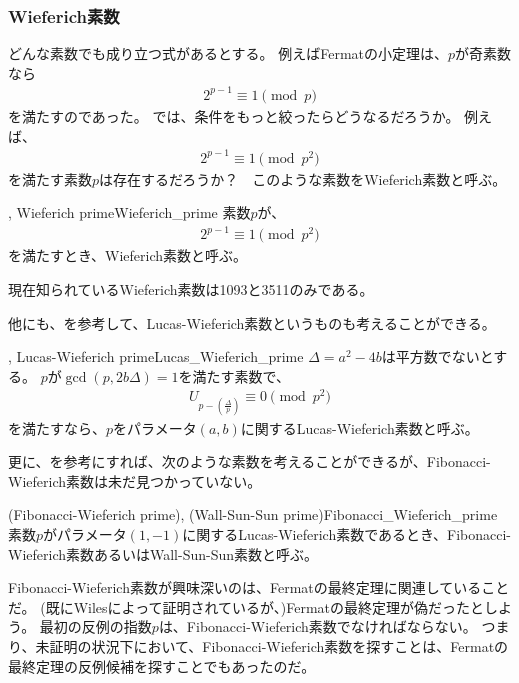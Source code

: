 \subsubsection{Wieferich素数}
どんな素数でも成り立つ式があるとする。
例えばFermatの小定理は、$p$が奇素数なら
\begin{align*}
2^{p-1} \equiv 1 \pmod{p}
\end{align*}
を満たすのであった。
では、条件をもっと絞ったらどうなるだろうか。
例えば、
\begin{align*}
2^{p-1} \equiv 1 \pmod{p^2}
\end{align*}
を満たす素数$p$は存在するだろうか？　このような素数をWieferich素数と呼ぶ。

\begin{Defi}{, Wieferich prime}{Wieferich_prime}
素数$p$が、
\begin{align*}
2^{p-1} \equiv 1 \pmod{p^2}
\end{align*}
を満たすとき、Wieferich素数と呼ぶ。
\end{Defi}

現在知られているWieferich素数は1093と3511のみである。

他にも、を参考して、Lucas-Wieferich素数というものも考えることができる。

\begin{Defi}{, Lucas-Wieferich prime}{Lucas_Wieferich_prime}
$\Delta=a^2-4b$は平方数でないとする。
$p$が$\gcd(p, 2b\Delta)=1$を満たす素数で、
\begin{align*}
U_{p - \left(\frac{\Delta}{p}\right)} \equiv 0 \pmod{p^2}
\end{align*}
を満たすなら、$p$をパラメータ$(a,b)$に関するLucas-Wieferich素数と呼ぶ。
\end{Defi}

更に、を参考にすれば、次のような素数を考えることができるが、Fibonacci-Wieferich素数は未だ見つかっていない。

\begin{Defi}{(Fibonacci-Wieferich prime), (Wall-Sun-Sun prime)}{Fibonacci_Wieferich_prime}
素数$p$がパラメータ$(1,-1)$に関するLucas-Wieferich素数であるとき、Fibonacci-Wieferich素数あるいはWall-Sun-Sun素数と呼ぶ。
\end{Defi}

Fibonacci-Wieferich素数が興味深いのは、Fermatの最終定理に関連していることだ。
(既にWilesによって証明されているが、)Fermatの最終定理が偽だったとしよう。
最初の反例の指数$p$は、Fibonacci-Wieferich素数でなければならない\cite{Zhi1992}。
つまり、未証明の状況下において、Fibonacci-Wieferich素数を探すことは、Fermatの最終定理の反例候補を探すことでもあったのだ。

